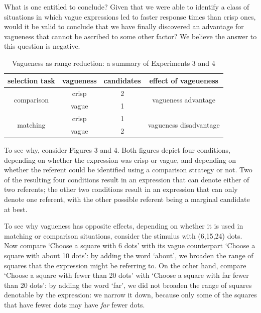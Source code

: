 \documentclass[%
man,		%
floatsintext,%
apacite%
]{apa6} %
\begin{document}
What is one entitled to conclude? Given that we were able to identify a class of situations in which vague expressions led to faster response times than crisp ones, would it be valid to conclude that we have finally discovered an advantage for vagueness that cannot be ascribed to some other factor? We believe the answer to this question is negative.

\begin{table}[htbp]
\caption{Vagueness as range reduction: a summary of Experiments 3 and 4}
\label{Vagueness as range reduction}
\centering
\begin{tabular}{cccc}
selection task 					& vagueness		& candidates	& effect of vageueness						\\
\toprule
\multirow{ 2}{*}{comparison} 	& crisp 		& 2				& \multirow{ 2}{*}{vagueness advantage}  	\\
\cline{2-3}
								& vague			& 1				&                                           \\
\midrule
\multirow{ 2}{*}{matching} 		& crisp 		& 1 			& \multirow{ 2}{*}{vagueness disadvantage}	\\
\cline{2-3}
								& vague			& 2				&								 			\\
\bottomrule
\end{tabular}
\end{table}

To see why, consider Figures 3 and 4. Both figures depict four conditions, depending on whether the expression was crisp or vague, and depending on whether the referent could be identified using a comparison strategy or not. Two of the resulting four conditions result in an expression that can denote either of two referents; the other two conditions result in an expression that can only denote one referent, with the other possible referent being a marginal candidate at best.

To see why vagueness has opposite effects, depending on whether it is used in matching or comparison situations, consider the stimulus with (6,15,24) dots. Now compare `Choose a square with 6 dots' with its vague counterpart `Choose a square with about 10 dots': by adding the word `about', we broaden the range of squares that the expression might be referring to. On the other hand, compare `Choose a square with fewer than 20 dots' with `Choose a square with far fewer than 20 dots': by adding the word `far', we did not broaden the range of squares denotable by the expression: we narrow it down, because only some of the squares that have fewer dots may have {\em far} fewer dots.
\end{document}
